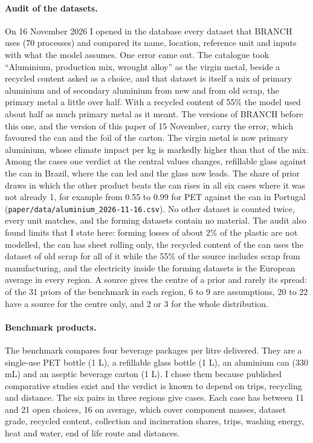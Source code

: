 \documentclass{article}
\begin{document}
\paragraph{Audit of the datasets.}
On 16 November 2026 I opened in the database every dataset that BRANCH uses (70 processes) and compared its
name, location, reference unit and inputs with what the model assumes. One error came out. The catalogue
took ``Aluminium, production mix, wrought alloy'' as the virgin metal, beside a recycled content asked as a
choice, and that dataset is itself a mix of primary aluminium and of secondary aluminium from new and from
old scrap, the primary metal a little over half. With a recycled content of 55\% the model used about
half as much primary metal as it meant. The versions of BRANCH before this one, and the version of this paper of 15 November, carry the error,
which favoured the can and the foil of the carton. The virgin metal is now primary aluminium,
whose climate impact per kg is markedly higher than that of the mix. Among the \nCases{} cases one verdict at the central
values changes, refillable glass against the can in Brazil, where the can led and the glass now leads. The
share of prior draws in which the other product beats the can rises in all six cases where it was not
already 1, for example from 0.55 to 0.99 for PET against the can in Portugal
(\texttt{paper/data/aluminium\_2026-11-16.csv}). No other dataset is counted twice, every unit matches,
and the forming datasets contain no material. The audit also found limits that I state here: forming
losses of about 2\% of the plastic are not modelled, the can has sheet rolling only, the recycled content
of the can uses the dataset of old scrap for all of it while the 55\% of the source includes scrap from
manufacturing, and the electricity inside the forming datasets is the European average in every region.
A source gives the centre of a prior and rarely its spread: of the 31 priors of the benchmark in each
region, 6 to 9 are assumptions, 20 to 22 have a source for the centre only, and 2 or 3 for the whole
distribution.

\paragraph{Benchmark products.}
The benchmark compares four beverage packages per litre delivered. They are a single-use PET bottle
(1 L), a refillable glass bottle (1 L), an aluminium can (330 mL) and an aseptic beverage carton (1 L).
I chose them because published comparative studies exist and the verdict is known to depend on trips,
recycling and distance. The six pairs in three regions give \nCases{} cases. Each case has between 11 and 21
open choices, 16 on average, which cover component masses, dataset grade, recycled content, collection
and incineration shares, trips, washing energy, heat and water, end of life route and distances.
\end{document}
